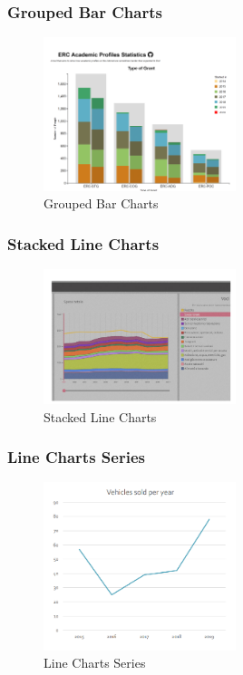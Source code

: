\subsubsection{Grouped Bar Charts}
\begin{figure}[H]
    \centering
    \includegraphics[width=0.5\textwidth]{images/GroupedBar.png} %
    \caption{Grouped Bar Charts}
    \label{fig:immagine}
\end{figure}
\subsubsection{Stacked Line Charts}
\begin{figure}[H]
    \centering
    \includegraphics[width=0.5\textwidth]{images/Stacked.png} %
    \caption{Stacked Line Charts}
    \label{fig:immagine}
\end{figure}
\subsubsection{Line Charts Series}
\begin{figure}[H]
    \centering
    \includegraphics[width=0.5\textwidth]{images/LineCharts.png} %
    \caption{Line Charts Series}
    \label{fig:immagine}
\end{figure}

